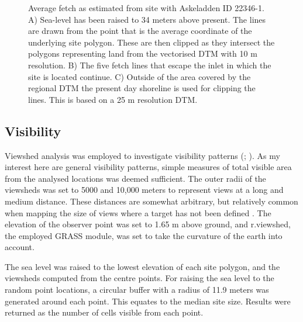 \documentclass[12pt, a4paper]{article}
\begin{document}
\begin{figure}[!htb]
	\caption{Average fetch as estimated from site with Askeladden ID 22346-1. A) Sea-level has been raised to 34 meters above present. The lines are drawn from the point that is the average coordinate of the underlying site polygon. These are then clipped as they intersect the polygons representing land from the vectorised DTM with 10 m resolution. B) The five fetch lines that escape the inlet in which the site is located continue. C) Outside of the area covered by the regional DTM the present day shoreline is used for clipping the lines. This is based on a 25 m resolution DTM.}\label{fig:fetch}
\end{figure}

\subsection{Visibility}
Viewshed analysis was employed to investigate visibility patterns (\citealp[][225--233]{conolly2006}; \citealp{gillings2020}). As my interest here are general visibility patterns, simple measures of total visible area from the analysed locations was deemed sufficient. The outer radii of the viewsheds was set to 5000 and 10,000 meters to represent views at a long and medium distance. These distances are somewhat arbitrary, but relatively common when mapping the size of views where a target has not been defined \citep[e.g.][]{lake2000, lopez2008, garcia2013}. The elevation of the observer point was set to 1.65 m above ground, and r.viewshed, the employed GRASS module, was set to take the curvature of the earth into account. \par
The sea level was raised to the lowest elevation of each site polygon, and the viewsheds computed from the centre points. For raising the sea level to the random point locations, a circular buffer with a radius of 11.9 meters was generated around each point. This equates to the median site size. Results were returned as the number of cells visible from each point. \par
\end{document}
